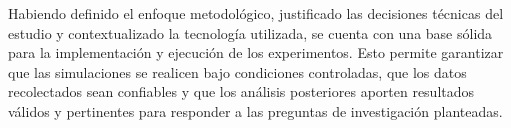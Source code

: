Habiendo definido el enfoque metodológico, justificado las decisiones técnicas del estudio y contextualizado la tecnología utilizada, se cuenta con una base sólida para la implementación y ejecución de los experimentos. Esto permite garantizar que las simulaciones se realicen bajo condiciones controladas, que los datos recolectados sean confiables y que los análisis posteriores aporten resultados válidos y pertinentes para responder a las preguntas de investigación planteadas.
